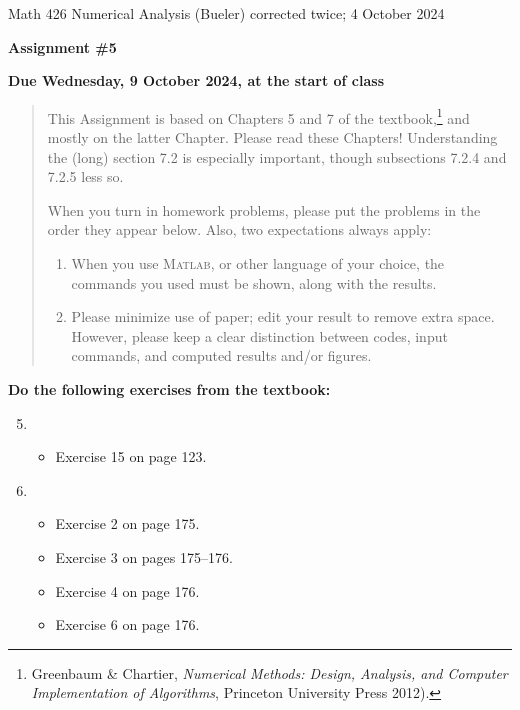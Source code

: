 \documentclass[12pt]{amsart}
\newcommand{\Matlab}{\textsc{Matlab}\xspace}
\begin{document}
\scriptsize \noindent Math 426 Numerical Analysis (Bueler) \hfill {\color{BrickRed} corrected twice; 4 October 2024}
\normalsize

\medskip\bigskip

\Large\centerline{\textbf{Assignment \#5}}
\large
\bigskip

\centerline{\textbf{Due {\color{BrickRed} Wednesday, 9 October 2024}, at the start of class}}
\medskip
\normalsize

\thispagestyle{empty}

\begin{quote}
{\small
This Assignment is based on Chapters 5 and 7 of the textbook,\footnote{Greenbaum \& Chartier, \emph{Numerical Methods: Design, Analysis, and Computer Implementation of Algorithms}, Princeton University Press 2012).} and mostly on the latter Chapter.  Please read these Chapters!  Understanding the (long) section 7.2 is especially important, though subsections 7.2.4 and 7.2.5 less so.

\medskip
\noindent When you turn in homework problems, please put the problems in the order they appear below.  Also, two expectations always apply:
\renewcommand{\labelenumi}{\arabic{enumi}.\,}
\begin{enumerate}
\item When you use \Matlab, or other language of your choice, the commands you used must be shown, along with the results.
\item Please minimize use of paper; edit your result to remove extra space.  However, please keep a clear distinction between codes, input commands, and computed results and/or figures.
\end{enumerate}
}
\end{quote}

\bigskip
\noindent \textbf{Do the following exercises from the textbook:}

\medskip
\renewcommand{\labelenumi}{{\footnotesize\underline{\textsc{Chapter \arabic{enumi}}}}}
\begin{enumerate}
\setcounter{enumi}{4}
\item ~
    \begin{itemize}
    \item Exercise 15 on page 123.
    \end{itemize}
\setcounter{enumi}{6}
\item ~
    \begin{itemize}
    \item Exercise 2 on page 175.
    \item Exercise 3 on pages 175--176.
    \item Exercise 4 on page 176.
    \item Exercise 6 on page 176.
    \end{itemize}
\end{enumerate}
\end{document}
